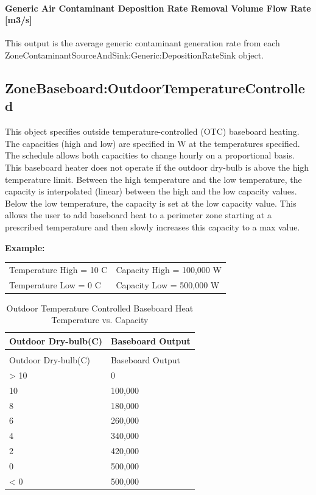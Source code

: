 \paragraph{Generic Air Contaminant Deposition Rate Removal Volume Flow Rate {[}m3/s{]}}\label{generic-air-contaminant-deposition-rate-removal-volume-flow-rate-m3s}

This output is the average generic contaminant generation rate from each Zone\-Contaminant\-Source\-And\-Sink:\-Generic:\-Deposition\-Rate\-Sink object.

\subsection{ZoneBaseboard:OutdoorTemperatureControlled}\label{zonebaseboardoutdoortemperaturecontrolled}

This object specifies outside temperature-controlled (OTC) baseboard heating. The capacities (high and low) are specified in W at the temperatures specified. The schedule allows both capacities to change hourly on a proportional basis. This baseboard heater does not operate if the outdoor dry-bulb is above the high temperature limit. Between the high temperature and the low temperature, the capacity is interpolated (linear) between the high and the low capacity values. Below the low temperature, the capacity is set at the low capacity value. This allows the user to add baseboard heat to a perimeter zone starting at a prescribed temperature and then slowly increases this capacity to a max value.

\textbf{Example:}

\begin{center}
  \begin{tabular}{@{}ll@{}}
    Temperature High = 10 C & Capacity High = 100,000 W \\
    Temperature Low = 0 C & Capacity Low = 500,000 W
  \end{tabular}
\end{center}

\begin{longtable}[c]{@{}ll@{}}
\caption{Outdoor Temperature Controlled Baseboard Heat Temperature vs. Capacity \label{table:outdoor-temperature-controlled-baseboard-heat}} \tabularnewline
\toprule
Outdoor Dry-bulb(C) & Baseboard Output \tabularnewline
\midrule
\endfirsthead

\caption[]{Outdoor Temperature Controlled Baseboard Heat Temperature vs. Capacity} \tabularnewline
\toprule
Outdoor Dry-bulb(C) & Baseboard Output \tabularnewline
\midrule
\endhead

> 10 & 0 \tabularnewline
10 & 100,000 \tabularnewline
8 & 180,000 \tabularnewline
6 & 260,000 \tabularnewline
4 & 340,000 \tabularnewline
2 & 420,000 \tabularnewline
0 & 500,000 \tabularnewline
< 0 & 500,000 \tabularnewline
\bottomrule
\end{longtable}

